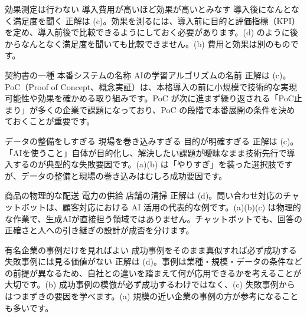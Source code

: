 
%
  {効果測定は行わない}%
  {導入費用が高いほど効果が高いとみなす}%
  {}%
  {導入後になんとなく満足度を聞く}%
  {正解は (c)。効果を測るには、導入前に目的と評価指標（KPI）を定め、導入前後で比較できるようにしておく必要があります。(d) のように後からなんとなく満足度を聞いても比較できません。(b) 費用と効果は別のものです。}

%
  {契約書の一種}%
  {本番システムの名称}%
  {}%
  {AIの学習アルゴリズムの名前}%
  {正解は (c)。PoC（Proof of Concept、概念実証）は、本格導入の前に小規模で技術的な実現可能性や効果を確かめる取り組みです。PoC が次に進まず繰り返される「PoC止まり」が多くの企業で課題になっており、PoC の段階で本番展開の条件を決めておくことが重要です。}

%
  {データの整備をしすぎる}%
  {現場を巻き込みすぎる}%
  {}%
  {目的が明確すぎる}%
  {正解は (c)。「AIを使うこと」自体が目的化し、解決したい課題が曖昧なまま技術先行で導入するのが典型的な失敗要因です。(a)(b) は「やりすぎ」を装った選択肢ですが、データの整備と現場の巻き込みはむしろ成功要因です。}

%
  {商品の物理的な配送}%
  {電力の供給}%
  {店舗の清掃}%
  {}%
  {正解は (d)。問い合わせ対応のチャットボットは、顧客対応における AI 活用の代表的な例です。(a)(b)(c) は物理的な作業で、生成AIが直接担う領域ではありません。チャットボットでも、回答の正確さと人への引き継ぎの設計が成否を分けます。}

%
  {有名企業の事例だけを見ればよい}%
  {成功事例をそのまま真似すれば必ず成功する}%
  {失敗事例には見る価値がない}%
  {}%
  {正解は (d)。事例は業種・規模・データの条件などの前提が異なるため、自社との違いを踏まえて何が応用できるかを考えることが大切です。(b) 成功事例の模倣が必ず成功するわけではなく、(c) 失敗事例からはつまずきの要因を学べます。(a) 規模の近い企業の事例の方が参考になることも多いです。}
